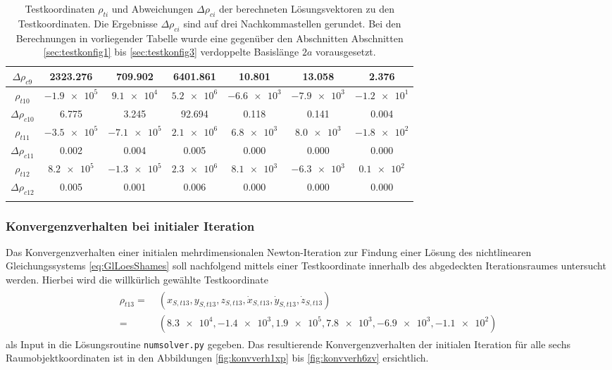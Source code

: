 \documentclass[a4paper,12pt]{article}
\numberwithin{equation}{section}
\begin{document}
\begin{longtable}{|c|c|c|c|c|c|c|}
$\Delta \rho_{c9}$ & 2323.276 & 709.902 & 6401.861 & 10.801 & 13.058 & 2.376 \\
\hline
$\rho_{t10}$ & $\num{-1.9e5}$ & $\num{9.1e4}$ & $\num{5.2e6}$ & $\num{-6.6e3}$ & $\num{-7.9e3}$ & $\num{-1.2e1}$ \\
$\Delta \rho_{c10}$ & 6.775 & 3.245 & 92.694 & 0.118 & 0.141 & 0.004 \\
\hline
$\rho_{t11}$ & $\num{-3.5e5}$ & $\num{-7.1e5}$ & $\num{2.1e6}$ & $\num{6.8e3}$ & $\num{8.0e3}$ & $\num{-1.8e2}$ \\
$\Delta \rho_{c11}$ & 0.002 & 0.004 & 0.005 & 0.000 & 0.000 & 0.000 \\
\hline
$\rho_{t12}$ & $\num{8.2e5}$ & $\num{-1.3e5}$ & $\num{2.3e6}$ & $\num{8.1e3}$ & $\num{-6.3e3}$ & $\num{0.1e2}$ \\
$\Delta \rho_{c12}$ & 0.005 & 0.001 & 0.006 & 0.000 & 0.000 & 0.000 \\
\hline
\caption{Testkoordinaten $\rho_{ti}$ und Abweichungen $\Delta \rho_{ci}$ der berechneten Lösungsvektoren zu den Testkoordinaten. Die Ergebnisse $\Delta \rho_{ci}$ sind auf drei Nachkommastellen gerundet. Bei den Berechnungen in vorliegender Tabelle wurde eine gegenüber den Abschnitten Abschnitten \ref{sec:testkonfig1} bis \ref{sec:testkonfig3} verdoppelte Basislänge $2a$ vorausgesetzt.}
\label{tab:testconfig5}
\end{longtable}
\renewcommand{\arraystretch}{1.0}

\FloatBarrier
\subsubsection{Konvergenzverhalten bei initialer Iteration}
Das Konvergenzverhalten einer initialen mehrdimensionalen Newton-Iteration zur Findung einer Lösung des nichtlinearen Gleichungssystems \eqref{eq:GlLoesShames} soll nachfolgend mittels einer Testkoordinate innerhalb des abgedeckten Iterationsraumes untersucht werden. Hierbei wird die willkürlich gewählte Testkoordinate \begin{align}\begin{aligned}
\rho_{t13} =&\; (x_{S,t13},y_{S,t13},z_{S,t13},\dot{x}_{S,t13},\dot{y}_{S,t13},\dot{z}_{S,t13})\\ =&\;(\num{8.3e4}, \num{-1.4e3}, \num{1.9e5}, \num{7.8e3}, \num{-6.9e3}, \num{-1.1e2})
\end{aligned}\end{align} als Input in die Lösungsroutine \verb|numsolver.py| gegeben. Das resultierende Konvergenzverhalten der initialen Iteration für alle sechs Raumobjektkoordinaten ist in den Abbildungen \ref{fig:konvverh1xp} bis \ref{fig:konvverh6zv} ersichtlich.
\end{document}
